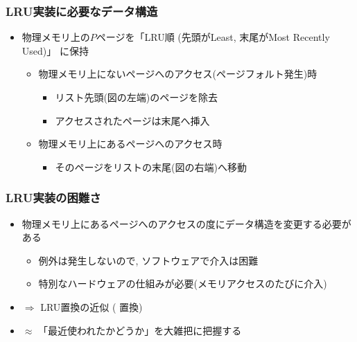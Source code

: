 \documentclass[12pt,dvipdfmx]{beamer}
\begin{document}
\begin{frame}
  \frametitle{LRU実装に必要なデータ構造}
  \begin{itemize}
  \item 物理メモリ上の$P$ページを「LRU順 (先頭がLeast, 末尾がMost Recently Used)」
    に保持 
    \begin{itemize}
    \item 物理メモリ上にないページへのアクセス(ページフォルト発生)時
      \begin{itemize}
      \item リスト先頭(図の左端)のページを除去
      \item アクセスされたページは末尾へ挿入
      \end{itemize}
    \item 物理メモリ上にあるページへのアクセス時
      \begin{itemize}
      \item そのページをリストの末尾(図の右端)へ移動
      \end{itemize}
    \end{itemize}
  \begin{center}
%
%
%
%
%
%
%
%
%
%
%
  \end{center}
  \end{itemize}
\end{frame}

\begin{frame}
  \frametitle{LRU実装の困難さ}
  \begin{itemize}
  \item 物理メモリ上にあるページへのアクセスの度にデータ構造を変更する必要がある
    \begin{itemize}
    \item 例外は発生しないので, ソフトウェアで介入は困難
    \item 特別なハードウェアの仕組みが必要(メモリアクセスのたびに介入)
    \end{itemize}
  \item $\Rightarrow$
    LRU置換の近似 ( 置換)
  \item $\approx$ 「最近使われたかどうか」を大雑把に把握する
  \end{itemize}
\end{frame}
\end{document}
